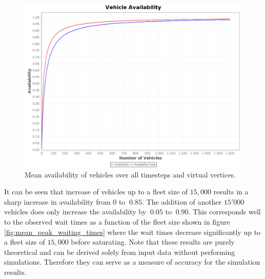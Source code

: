 \begin{figure}[h]
\begin{center}\includegraphics[width=1.0\textwidth]{figures/availbilitiesByNumberVehicles.png}\end{center}
\caption{Mean availability of vehicles over all timesteps and virtual vertices. }
\label{fig:performanceavailability}
\end{figure}

It can be seen that increase of vehicles up to a fleet size of $15,000$ results in a sharp increase in availability from $0$ to $~0.85$. The addition of another $15'000$ vehicles does only increase the availability by $~0.05$ to $~0.90$. This corresponds well to the observed wait times as a function of the fleet size shown in figure \ref{fig:mean_peak_waiting_times} where the wait times decrease significantly up to a fleet size of $15,000$ before saturating. Note that these results are purely theoretical and can be derived solely from input data without performing simulations. Therefore they can serve as a measure of accuracy for the simulation results.
